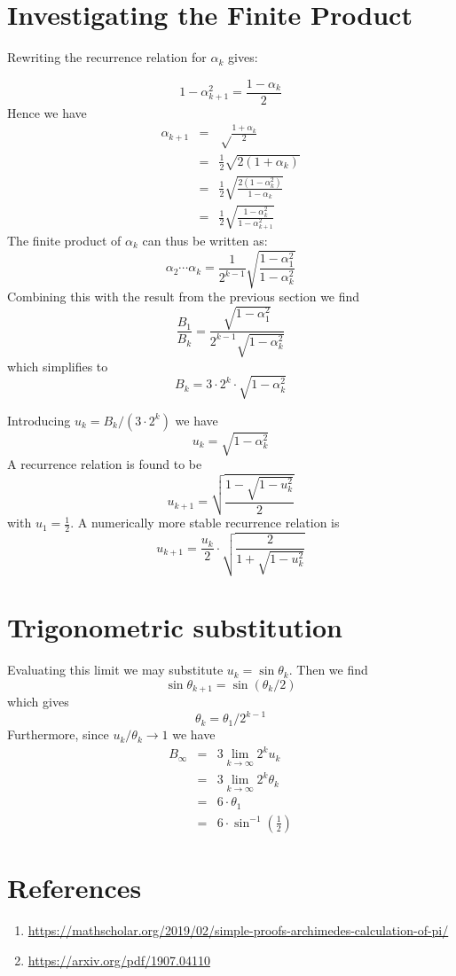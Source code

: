 \documentclass[12pt,oneside,a4paper]{article}
\begin{document}
\section{Investigating the Finite Product}
Rewriting the recurrence relation for $\alpha_k$ gives:

$$
1 - \alpha_{k+1}^2 = \frac{1-\alpha_k}{2}
$$
Hence we have
\begin{eqnarray*}
    \alpha_{k+1} &=& \sqrt\frac{1+\alpha_k}{2} \\
    &=& \frac12 \sqrt{2(1+\alpha_k)} \\
    &=& \frac12 \sqrt{\frac{2(1-\alpha_k^2)}{1-\alpha_k}} \\
    &=& \frac12 \sqrt{\frac{1-\alpha_k^2}{1 - \alpha_{k+1}^2}}
\end{eqnarray*}
The finite product of $\alpha_k$ can thus be written as:
$$
\alpha_2\cdots\alpha_k = \frac{1}{2^{k-1}} \sqrt{\frac{1-\alpha_1^2}{1-\alpha_k^2}}
$$
Combining this with the result from the previous section we find
$$
\frac{B_1}{B_k} = \frac{\sqrt{1-\alpha_1^2}}{2^{k-1} \sqrt{1-\alpha_k^2}}
$$
which simplifies to
$$
B_k = 3 \cdot 2^k \cdot \sqrt{1-\alpha_k^2}
$$

Introducing $u_k = B_k / (3\cdot 2^k)$ we have
$$
u_k = \sqrt{1-\alpha_k^2}
$$
A recurrence relation is found to be
$$
u_{k+1} = \sqrt{\frac{1-\sqrt{1-u_k^2}}{2}}
$$
with $u_1 = \frac12$.
A numerically more stable recurrence relation is
$$
u_{k+1} = \frac{u_k}{2} \cdot \sqrt{\frac{2}{1+\sqrt{1-u_k^2}}}
$$

\section{Trigonometric substitution}

Evaluating this limit we may substitute $u_k = \sin\theta_k$. Then we find
$$
\sin\theta_{k+1} = \sin(\theta_k / 2)
$$
which gives
$$
\theta_k = \theta_1 / 2^{k-1}
$$
Furthermore, since $u_k/\theta_k \rightarrow 1$ we have
\begin{eqnarray*}
    B_\infty &=& 3 \lim_{k\rightarrow\infty} 2^k u_k \\
    &=& 3 \lim_{k\rightarrow\infty} 2^k \theta_k \\
    &=& 6 \cdot \theta_1 \\
    &=& 6 \cdot \sin^{-1} \left(\frac12\right)
\end{eqnarray*}


\section{References}
\begin{enumerate}
\item \url{https://mathscholar.org/2019/02/simple-proofs-archimedes-calculation-of-pi/}
\item \url{https://arxiv.org/pdf/1907.04110}
\end{enumerate}
\end{document}
